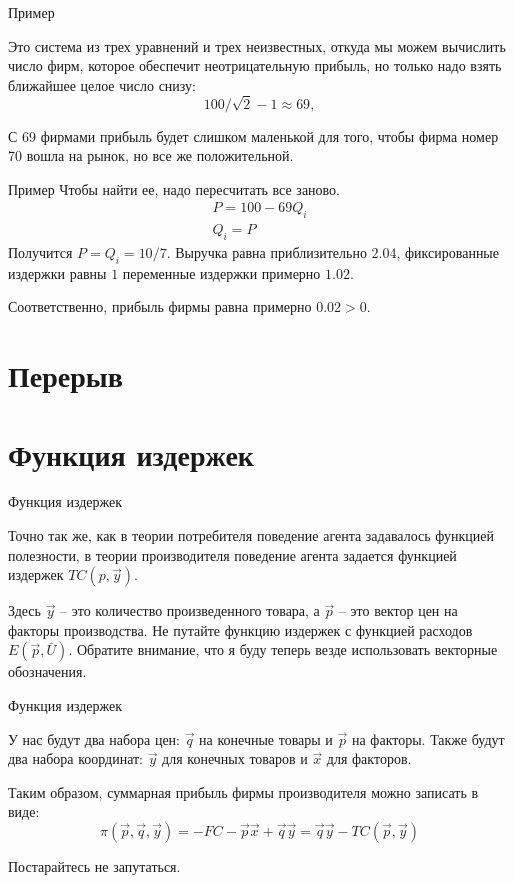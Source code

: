 \documentclass{beamer}
\begin{document}
\begin{frame}{Пример}

Это система из трех уравнений и трех неизвестных, откуда мы можем вычислить число фирм, которое обеспечит неотрицательную прибыль, но только надо взять ближайшее целое число снизу:
$$100/\sqrt{2} - 1 \approx 69,$$

С 69 фирмами прибыль будет слишком маленькой для того, чтобы фирма номер 70 вошла на рынок, но все же положительной.

\end{frame}

\begin{frame}{Пример}
Чтобы найти ее, надо пересчитать все заново.
\begin{gather*}
P = 100 - 69 Q_i\\
Q_i = P
\end{gather*}
Получится $P = Q_i = 10/7$. Выручка равна приблизительно $2.04$, фиксированные издержки равны $1$ переменные издержки примерно $1.02$. 

Соответственно, прибыль фирмы равна примерно $0.02>0$.

\end{frame}

\section{Перерыв}

\section{Функция издержек}

\begin{frame}{Функция издержек}

Точно так же, как в теории потребителя поведение агента задавалось функцией полезности, в теории производителя поведение агента задается функцией издержек $TC(p, \vec y)$.

Здесь $\vec y$ – это количество произведенного товара, а $\vec p$ – это вектор цен на факторы производства. Не путайте функцию издержек с функцией расходов $E(\vec p, \bar U)$. Обратите внимание, что я буду теперь везде использовать векторные обозначения.

\end{frame}

\begin{frame}{Функция издержек}

У нас будут два набора цен: $\vec q$ на конечные товары и $\vec p$ на факторы. Также будут два набора координат: $\vec y$ для конечных товаров и $\vec x$ для факторов.

Таким образом, суммарная прибыль фирмы производителя можно записать в виде:
$$ \pi(\vec p, \vec q, \vec y) = - FC - \vec p \vec x + \vec q \vec y = \vec q \vec y - TC(\vec p, \vec y)$$

Постарайтесь не запутаться.

\end{frame}
\end{document}
